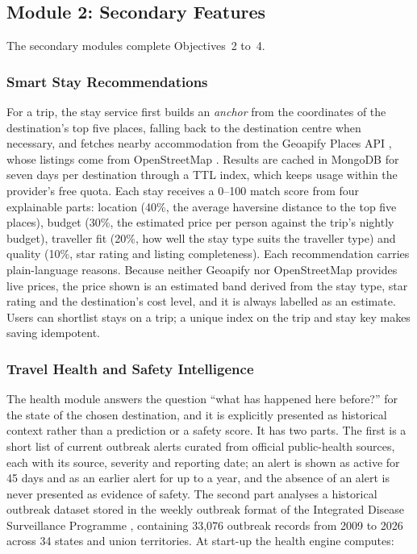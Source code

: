 \subsection{Module 2: Secondary Features}

The secondary modules complete Objectives~2 to~4.

\subsubsection{Smart Stay Recommendations}

For a trip, the stay service first builds an \emph{anchor} from the
coordinates of the destination's top five places, falling back to the
destination centre when necessary, and fetches nearby accommodation from the
Geoapify Places API \cite{geoapify}, whose listings come from OpenStreetMap
\cite{haklay2008osm}. Results are cached in MongoDB for seven days per
destination through a TTL index, which keeps usage within the provider's
free quota. Each stay receives a 0--100 match score from four explainable
parts: location (40\%, the average haversine distance to the top five
places), budget (30\%, the estimated price per person against the trip's
nightly budget), traveller fit (20\%, how well the stay type suits the
traveller type) and quality (10\%, star rating and listing completeness).
Each recommendation carries plain-language reasons. Because neither Geoapify
nor OpenStreetMap provides live prices, the price shown is an estimated band
derived from the stay type, star rating and the destination's cost level,
and it is always labelled as an estimate. Users can shortlist stays on a
trip; a unique index on the trip and stay key makes saving idempotent.

\subsubsection{Travel Health and Safety Intelligence}

The health module answers the question ``what has happened here before?''
for the state of the chosen destination, and it is explicitly presented as
historical context rather than a prediction or a safety score. It has two
parts. The first is a short list of current outbreak alerts curated from
official public-health sources, each with its source, severity and
reporting date; an alert is shown as active for 45 days and as an earlier
alert for up to a year, and the absence of an alert is never presented as
evidence of safety. The second part analyses a historical outbreak dataset
stored in the weekly outbreak format of the Integrated Disease Surveillance
Programme \cite{idsp}, containing 33{,}076 outbreak records from 2009 to
2026 across 34 states and union territories. At start-up the health engine
computes:


